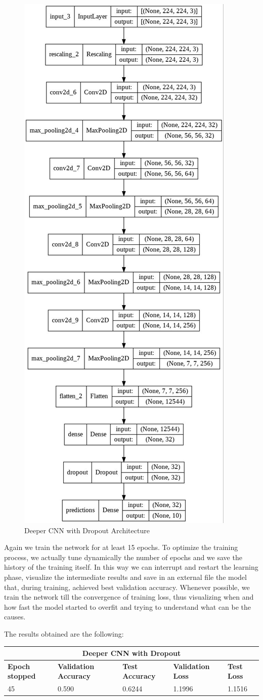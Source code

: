 \begin{figure}[H]
	\centering
	\includegraphics[height=0.6\textwidth]{img/scratch/DropoutCNN.jpg}
	\caption{Deeper CNN with Dropout Architecture}
	\label{fig: DeeperDropout}
\end{figure}

\noindent Again we train the network for at least 15 epochs. To optimize the training process, we actually tune dynamically the number of epochs and we save the history of the training itself. In this way we can interrupt and restart the learning phase, visualize the intermediate results and save in an external file the model that, during training, achieved best validation accuracy. Whenever possible, we train the network till the convergence of training loss, thus visualizing when and how fast the model started to overfit and trying to understand what can be the causes.

\noindent The results obtained are the following:

\medskip

\begin{tabular}{ |p{2cm}|p{2cm}|p{2cm}|p{2cm}|p{2cm}|  }
\hline
\multicolumn{5}{|c|}{Deeper CNN with Dropout} \\
\hline
\textbf{Epoch stopped} & \textbf{Validation Accuracy} & \textbf{Test Accuracy} & \textbf{Validation Loss} & \textbf{Test Loss} \\
\hline
45 & 0.590 & 0.6244 & 1.1996 & 1.1516\\
\hline
\end{tabular}

\medskip



